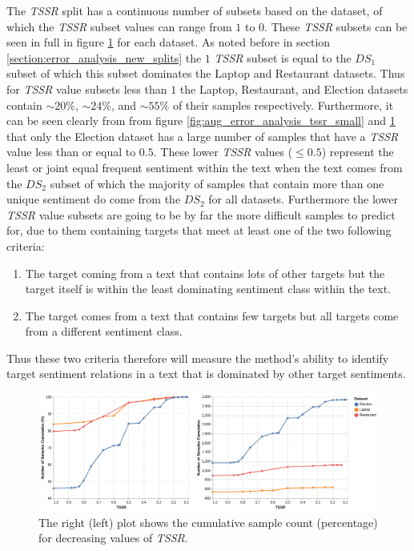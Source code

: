 The \textit{TSSR} split has a continuous number of subsets based on the dataset, of which the \textit{TSSR} subset values can range from $1$ to $0$. These \textit{TSSR} subsets can be seen in full in figure \ref{fig:aug_error_analysis_tssr_full} for each dataset. As noted before in section \ref{section:error_analysis_new_splits} the $1$ \textit{TSSR} subset is equal to the $DS_1$ subset of which this subset dominates the Laptop and Restaurant datasets. Thus for \textit{TSSR} value subsets less than $1$ the Laptop, Restaurant, and Election datasets contain $\sim20\%$, $\sim24\%$, and $\sim55\%$ of their samples respectively. Furthermore, it can be seen clearly from from figure \ref{fig:aug_error_analysis_tssr_small} and \ref{fig:aug_error_analysis_tssr_full} that only the Election dataset has a large number of samples that have a \textit{TSSR} value less than or equal to $0.5$. These lower \textit{TSSR} values ($\leq 0.5$) represent the least or joint equal frequent sentiment within the text when the text comes from the $DS_2$ subset of which the majority of samples that contain more than one unique sentiment do come from the $DS_2$ for all datasets. Furthermore the lower \textit{TSSR} value subsets are going to be by far the more difficult samples to predict for, due to them containing targets that meet at least one of the two following criteria:
\begin{enumerate}
    \item The target coming from a text that contains lots of other targets but the target itself is within the least dominating sentiment class within the text.
    \item The target comes from a text that contains few targets but all targets come from a different sentiment class.
\end{enumerate}
Thus these two criteria therefore will measure the method's ability to identify target sentiment relations in a text that is dominated by other target sentiments.

\begin{figure}[!ht]
    \centering
    \includegraphics[scale=0.42]{images/augmentation/error_analysis/tssr_full_range.png}
    \caption{The right (left) plot shows the cumulative sample count (percentage) for decreasing values of \textit{TSSR}.}
    \label{fig:aug_error_analysis_tssr_full}
\end{figure}

